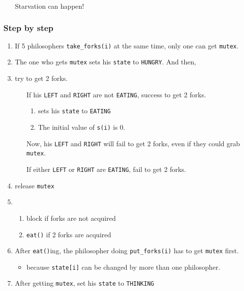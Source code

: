 \begin{itemize}
\item[\danger{}] Starvation can happen!
\end{itemize}

\subsubsection{Step by step}

\begin{enumerate}
\item If 5 philosophers \texttt{take\_forks(i)} at the same time, only one can get \texttt{mutex}.
\item The one who gets \texttt{mutex} sets his \texttt{state} to \texttt{HUNGRY}. And then,
\item {} try to get 2 forks.
  \begin{enumerate}
  \item[If] his \texttt{LEFT} and \texttt{RIGHT} are not \texttt{EATING}, success to get 2 forks.
    \begin{enumerate}
    \item sets his \texttt{state} to \texttt{EATING}
    \item {} The initial value of \texttt{s(i)} is 0.
    \end{enumerate}
    Now, his \texttt{LEFT} and \texttt{RIGHT} will fail to get 2 forks, even if
    they could grab \texttt{mutex}.
  \item [If] either \texttt{LEFT} or \texttt{RIGHT} are \texttt{EATING}, fail to get 2 forks.
  \end{enumerate}
\item release \texttt{mutex}
\item {}
  \begin{enumerate}
  \item block if forks are not acquired
  \item \texttt{eat()} if 2 forks are acquired
  \end{enumerate}
\item After \texttt{eat()}ing, the philosopher doing \texttt{put\_forks(i)} has to get
  \texttt{mutex} first.
  \begin{itemize}
  \item because \texttt{state[i]} can be changed by more than one philosopher.
  \end{itemize}
\item After getting \texttt{mutex}, set his \texttt{state} to \texttt{THINKING}

\end{enumerate}
